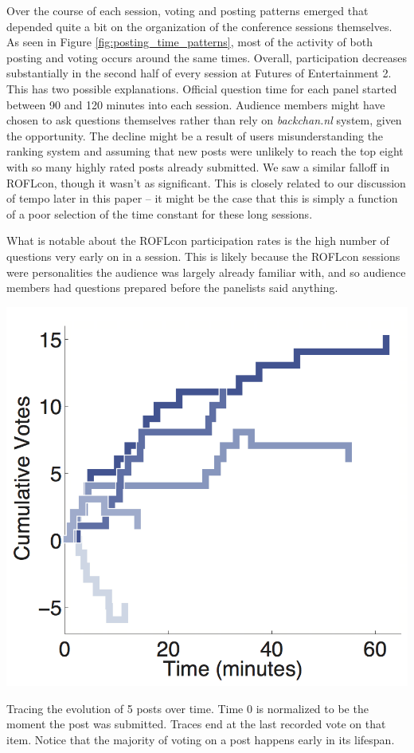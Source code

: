 Over the course of each session, voting and posting patterns emerged that depended quite a bit on the organization of the conference sessions themselves. As seen in Figure \ref{fig:posting_time_patterns}, most of the activity of both posting and voting occurs around the same times. Overall, participation decreases substantially in the second half of every session at Futures of Entertainment 2. This has two possible explanations. Official question time for each panel started between 90 and 120 minutes into each session. Audience members might have chosen to ask questions themselves rather than rely on \emph{backchan.nl} system, given the opportunity. The decline might be a result of users misunderstanding the ranking system and assuming that new posts were unlikely to reach the top eight with so many highly rated posts already submitted. We saw a similar falloff in ROFLcon, though it wasn't as significant. This is closely related to our discussion of tempo later in this paper – it might be the case that this is simply a function of a poor selection of the time constant for these long sessions. 

What is notable about the ROFLcon participation rates is the high number of questions very early on in a session. This is likely because the ROFLcon sessions were personalities the audience was largely already familiar with, and so audience members had questions prepared before the panelists said anything.

\begin{marginfigure}
	\includegraphics{figures/backchannl/cumulative_vote_histories_colors.png}
	\caption{Tracing the evolution of 5 posts over time. Time 0 is normalized to be the moment the post was submitted. Traces end at the last recorded vote on that item. Notice that the majority of voting on a post happens early in its lifespan.}
	\label{fig:post_score_evolution}
\end{marginfigure}


